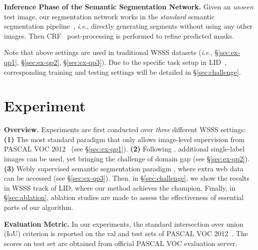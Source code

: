 \documentclass[runningheads]{llncs}
\newcommand{\ie}{\textit{i}.\textit{e}.}
\begin{document}
\noindent\textbf{Inference Phase of the Semantic Segmentation Network.} Given an \textit{unseen} test image, our segmentation network works in the \textit{standard} semantic segmentation pipeline~\cite{chen2017deeplab}, \ie, directly generating segments without using any other images. Then CRF~\cite{krahenbuhl2011efficient} post-processing is performed to refine predicted masks.

Note that above settings are used in traditional WSSS datasets (\ie, \S\ref{sec:ex-qp1}, \S\ref{sec:ex-qp2}, \S\ref{sec:ex-qp3}). Due to the specific task setup in LID\!~\cite{lid2020}, corresponding training and testing settings will be detailed in \S\ref{sec:challenge}.


\vspace{-10pt}
\section{Experiment}
\label{sec:exp}
\vspace{-5pt}
\noindent\textbf{Overview.} Experiments
are first conducted over \textit{three} different WSSS settings: \textbf{(1)} The most standard paradigm \cite{oaa2019,ssdd2019,wei2017object,dsrg2018} that only allows image-level supervision from PASCAL VOC 2012~\cite{everingham2015pascal} (see \S\ref{sec:ex-qp1}). \textbf{(2)} Following \cite{li2019attention,pinheiro2015image}, additional single-label images can be used, yet bringing the challenge of domain gap (see \S\ref{sec:ex-qp2}). \textbf{(3)} Webly supervised semantic segmentation paradigm \cite{lee2019frame,shen2018bootstrapping,jin2017webly}, where extra web data can be accessed (see \S\ref{sec:ex-qp3}). Then, in \S\ref{sec:challenge}, we show the results in WSSS track of LID, where our method achieves the champion. Finally, in \S\ref{sec:ablation}, ablation studies are made to assess the effectiveness of essential parts of our algorithm.






\noindent\textbf{Evaluation Metric.} In our experiments, the standard intersection over union (IoU) criterion is reported on the val and test sets of PASCAL VOC 2012~\cite{everingham2015pascal}. The scores on test set are obtained from official PASCAL VOC evaluation server.








\vspace{-8pt}
\end{document}
